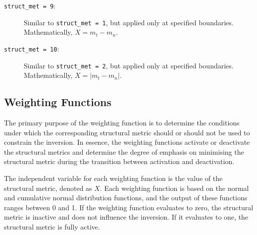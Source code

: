 \documentclass[a4paper,12pt]{article}
\begin{document}
\begin{description}
    \item[\texttt{struct\_met = 9}:] Similar to \texttt{struct\_met = 1}, but applied only at specified boundaries. Mathematically, \( X = m_t - m_n \).
    
    \item[\texttt{struct\_met = 10}:] Similar to \texttt{struct\_met = 2}, but applied only at specified boundaries. Mathematically, \( X = |m_t - m_n| \).
\end{description}

\subsection{Weighting Functions} \label{weighting_functions}

The primary purpose of the weighting function is to determine the conditions under which the corresponding structural metric should or should not be used to constrain the inversion. In essence, the weighting functions activate or deactivate the structural metrics and determine the degree of emphasis on minimising the structural metric during the transition between activation and deactivation.

The independent variable for each weighting function is the value of the structural metric, denoted as \(X\). Each weighting function is based on the normal and cumulative normal distribution functions, and the output of these functions ranges between 0 and 1. If the weighting function evaluates to zero, the structural metric is inactive and does not influence the inversion. If it evaluates to one, the structural metric is fully active.
\end{document}
